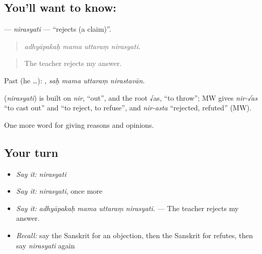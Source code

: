 \subsection*{You'll want to know: }
\textbf{} — \emph{nirasyati} — \textquotedblleft{}rejects (a claim)\textquotedblright{}.

\begin{quote}
   
\end{quote}

\begin{quote}
\emph{adhyāpakaḥ mama uttaraṃ nirasyati.}
\end{quote}

\begin{quote}
The teacher rejects my answer.
\end{quote}

Past (he …):    , \emph{saḥ mama uttaraṃ nirastavān}.

\begin{cousinweb}
\textbf{} (\emph{nirasyati}) is built on \emph{nir}, \textquotedblleft{}out\textquotedblright{}, and the root √as, \textquotedblleft{}to throw\textquotedblright{}; MW gives \emph{nir-√as} \textquotedblleft{}to cast out\textquotedblright{} and \textquotedblleft{}to reject, to refuse\textquotedblright{}, and \emph{nir-asta} \textquotedblleft{}rejected, refuted\textquotedblright{} (MW).
\end{cousinweb}

\begin{grammarlens}[title={What you've built}]
One more word for giving reasons and opinions.
\end{grammarlens}

\subsection*{Your turn}
\begin{itemize}
\raggedright
  \item \emph{Say it:} \emph{nirasyati}
  \item \emph{Say it:} \emph{nirasyati}, once more
  \item \emph{Say it:} \emph{adhyāpakaḥ mama uttaraṃ nirasyati.} — The teacher rejects my answer.
  \item \emph{Recall:} say the Sanskrit for an objection, then the Sanskrit for refutes, then say \emph{nirasyati} again
\end{itemize}

